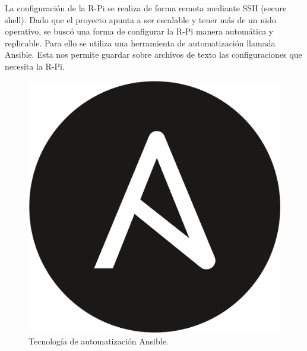 La configuración de la R-Pi se realiza de forma remota mediante SSH (secure shell).
Dado que el proyecto apunta a ser escalable y tener más de un nido operativo, se buscó una forma de configurar la R-Pi manera automática y replicable. Para ello se utiliza una herramienta de automatización llamada Ansible. Esta nos permite guardar sobre archivos de texto las configuraciones que necesita la R-Pi.

\begin{figure}[H]
	\centering
	\includegraphics[width=0.2\linewidth]{"../Ingenieria de Detalle/ImagenesIngenieria de Detalle/Ansible_logo"}
	\caption{Tecnología de automatización Ansible.}
	\label{fig:ansiblelogo}
\end{figure}














